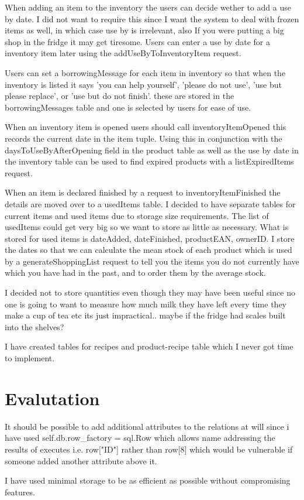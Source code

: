 \documentclass[]{article}
\begin{document}
When adding an item to the inventory the users can decide wether to add a use by date. I did not want to require this since I want the system to deal with frozen items as well, in which case use by is irrelevant, also If you were putting a big shop in the fridge it may get tiresome. Users can enter a use by date  for a inventory item later using the addUseByToInventoryItem request. 

Users can set a borrowingMessage for each item in inventory so that when the inventory is listed it says 'you can help yourself', 'please do not use', 'use but please replace', or 'use but do not finish'. these are stored in the borrowingMessages table and one is selected by users for ease of use.

When an inventory item is opened users should call inventoryItemOpened this records the current date in the item tuple. Using this in conjunction with the daysToUseByAfterOpening field in the product table as well as the use by date in the inventory table can be used to find expired products with a listExpiredItems request.

When an item is declared finished by a request to inventoryItemFinished the details are moved over to a usedItems table. I decided to have separate tables for current items and used items due to storage size requirements. The list of usedItems could get very big so we want to store as little as necessary. What is stored for used items is dateAdded, dateFinished, productEAN, ownerID. I store the dates so that we can calculate the mean stock of each product which is used by a generateShoppingList request to tell you the items you do not currently have which you have had in the past, and to order them by the average stock.

I decided not to store quantities even though they may have been useful since no one is going to want to measure how much milk they have left every time they make a cup of tea etc its just impractical.. maybe if the fridge had scales built into the shelves?

I have created tables for recipes and product-recipe table which I never got time to implement.

\section{Evalutation}
It should be possible to add additional attributes to the relations at will since i have used self.db.row\_factory = sql.Row which allows name addressing the results of executes i.e. row["ID"] rather than row[8] which would be vulnerable if someone added another attribute above it.

I have used minimal storage to be as efficient as possible without compromising features.
\end{document}
